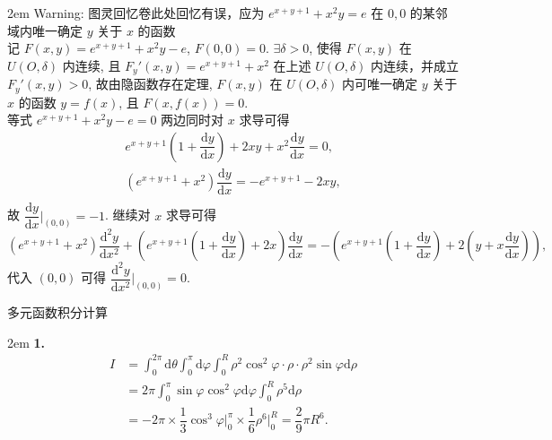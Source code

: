\documentclass[UTF8,14pt,normal]{ctexart}
\begin{document}
    \hangindent 2em
    \noindent
    Warning: 图灵回忆卷此处回忆有误，应为 \(e^{x + y + 1} + x^2y = e\) 在 \(0, 0\) 的某邻域内唯一确定 \(y\) 关于 \(x\) 的函数 \\ 
    记 \(F(x, y) = e^{x + y + 1} + x^2y - e\), \(F(0, 0) = 0\). \(\exists \delta > 0\), 使得 \(F(x, y)\) 在 \(U(O, \delta)\) 内连续, 且 \(F_y'(x, y) = e^{x + y + 1} + x^2\) 在上述 \(U(O, \delta)\) 内连续，并成立 \(F_y'(x, y) > 0\), 故由隐函数存在定理, \(F(x, y)\) 在 \(U(O, \delta)\) 内可唯一确定 \(y\) 关于 \(x\) 的函数 \(y = f(x)\), 且 \(F(x, f(x)) = 0\). \\
    等式 \(e^{x + y + 1} + x^2y - e = 0\) 两边同时对 \(x\) 求导可得
    \begin{gather*}
        e^{x + y + 1} (1 + \dfrac{\mathrm{d} y}{\mathrm{d} x}) + 2xy + x^2 \dfrac{\mathrm{d} y}{\mathrm{d} x} = 0, \\
        (e^{x + y + 1} + x^2) \dfrac{\mathrm{d} y}{\mathrm{d} x} = -e^{x + y + 1} - 2xy, \\
    \end{gather*}
    故 \(\dfrac{\mathrm{d} y}{\mathrm{d} x} \bigg|_{(0, 0)} = -1\).
    继续对 \(x\) 求导可得
    \[
        (e^{x + y + 1} + x^2) \dfrac{\mathrm{d}^2 y}{\mathrm{d} x^2} + (e^{x + y + 1} (1 + \dfrac{\mathrm{d} y}{\mathrm{d} x}) + 2x) \dfrac{\mathrm{d} y}{\mathrm{d} x} = -(e^{x + y + 1}(1 + \dfrac{\mathrm{d} y}{\mathrm{d} x}) + 2(y + x\dfrac{\mathrm{d} y}{\mathrm{d} x})),
    \]
    代入 \((0, 0)\) 可得 \(\dfrac{\mathrm{d}^2 y}{\mathrm{d} x^2} \bigg|_{(0, 0)} = 0\).

 多元函数积分计算

    \hangindent 2em
    \noindent
    \textbf{1.} 
    \begin{align*}
        I & = \int_{0}^{2\pi} \mathrm{d} \theta \int_{0}^{\pi} \mathrm{d} \varphi \int_{0}^{R} \rho^2 \cos^2 \varphi \cdot \rho \cdot \rho^2 \sin \varphi \mathrm{d} \rho \\ & = 2\pi \int_{0}^{\pi} \sin \varphi \cos^2 \varphi \mathrm{d} \varphi \int_{0}^{R} \rho^5 \mathrm{d} \rho \\ & = -2\pi \times \dfrac{1}{3} \cos^3 \varphi \bigg|_{0}^{\pi} \times \dfrac{1}{6} \rho^6 \bigg|_{0}^{R} = \dfrac{2}{9} \pi R^6.
    \end{align*}
\end{document}
